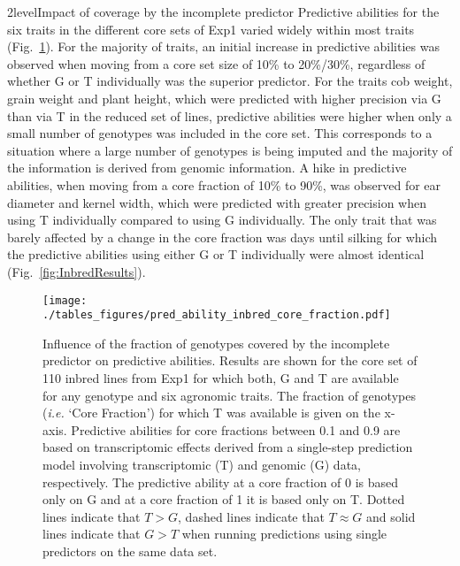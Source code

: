 \documentclass[12pt,titlepage]{article}
\begin{document}
\Genetics2level{Impact of coverage by the incomplete predictor}
Predictive abilities for the six traits in the different core sets of Exp1
varied widely within most traits (Fig.~\ref{fig:core-results}).
For the majority of traits, an initial increase in predictive abilities was
observed when moving from a core set size of 10\% to 20\%/30\%, regardless of
whether G or T individually was the superior predictor.
For the traits cob weight, grain weight and plant height, which were predicted
with higher precision via G than via T in the reduced set of lines, predictive
abilities were higher when only a small number of genotypes was included in the
core set.
This corresponds to a situation where a large number of genotypes is being 
imputed and the majority of the information is derived from genomic information.
A hike in predictive abilities, when moving from a core fraction of 10\% to 
90\%, was observed for ear diameter and kernel width, which were predicted with
greater precision when using T individually compared to using G individually.
The only trait that was barely affected by a change in the core fraction was
days until silking for which the predictive abilities using either G or T
individually were almost identical (Fig.~\ref{fig:InbredResults}).

\begin{figure}[H]
  \centering
  \texttt{[image: ./tables\_figures/pred\_ability\_inbred\_core\_fraction.pdf]}
  \caption{
  Influence of the fraction of genotypes covered by the incomplete predictor
  on predictive abilities.
  Results are shown for the core set of 110 inbred lines from Exp1 for
  which both, G and T are available for any genotype and six agronomic traits.
  The fraction of genotypes (\textit{i.e.} `Core Fraction') for which
  T was available is given on the x-axis.
  Predictive abilities for core fractions between 0.1 and 0.9 are based on
  transcriptomic effects derived from a single-step prediction model involving
  transcriptomic (T) and genomic (G) data, respectively.
  The predictive ability at a core fraction of 0 is based only on G and at a
  core fraction of 1 it is based only on T.
  Dotted lines indicate that $T > G$, dashed lines indicate that $T \approx G$
  and solid lines indicate that $G > T$ when running predictions using single
  predictors on the same data set.
  }
\label{fig:core-results}
\end{figure}
\end{document}

